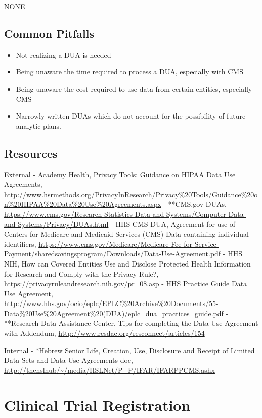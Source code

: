 \documentclass[]{book}
\providecommand{\tightlist}{%
  \setlength{\itemsep}{0pt}\setlength{\parskip}{0pt}}
\begin{document}
NONE

\subsection{Common Pitfalls}\label{common-pitfalls-5}

\begin{itemize}
\tightlist
\item
  Not realizing a DUA is needed
\item
  Being unaware the time required to process a DUA, especially with CMS
\item
  Being unaware the cost required to use data from certain entities,
  especially CMS
\item
  Narrowly written DUAs which do not account for the possibility of
  future analytic plans.
\end{itemize}

\subsection{Resources}\label{resources-6}

External - Academy Health, Privacy Tools: Guidance on HIPAA Data Use
Agreements,
\url{http://www.hsrmethods.org/PrivacyInResearch/Privacy\%20Tools/Guidance\%20on\%20HIPAA\%20Data\%20Use\%20Agreements.aspx}
- **CMS.gov DUAs,
\url{https://www.cms.gov/Research-Statistics-Data-and-Systems/Computer-Data-and-Systems/Privacy/DUAs.html}
- HHS CMS DUA, Agreement for use of Centers for Medicare and Medicaid
Services (CMS) Data containing individual identifiers,
\url{https://www.cms.gov/Medicare/Medicare-Fee-for-Service-Payment/sharedsavingsprogram/Downloads/Data-Use-Agreement.pdf}
- HHS NIH, How can Covered Entities Use and Disclose Protected Health
Information for Research and Comply with the Privacy Rule?,
\url{https://privacyruleandresearch.nih.gov/pr_08.asp} - HHS Practice
Guide Data Use Agreement,
\url{http://www.hhs.gov/ocio/eplc/EPLC\%20Archive\%20Documents/55-Data\%20Use\%20Agreement\%20(DUA)/eplc_dua_practices_guide.pdf}
- **Research Data Assistance Center, Tips for completing the Data Use
Agreement with Addendum,
\url{http://www.resdac.org/resconnect/articles/154}

Internal - *Hebrew Senior Life, Creation, Use, Disclosure and Receipt of
Limited Data Sets and Data Use Agreements doc,
\url{http://thehslhub/~/media/HSLNet/P_P/IFAR/IFARPPCMS.ashx}

\section{Clinical Trial Registration}\label{clinical-trial-registration}
\end{document}
